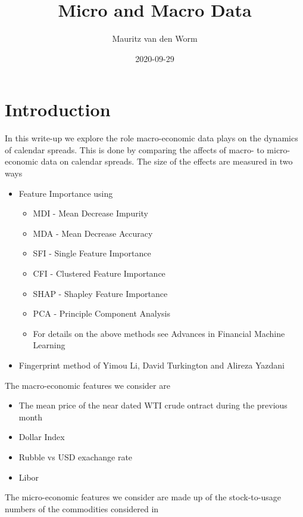 \documentclass[
]{book}
\title{Micro and Macro Data}
\author{Mauritz van den Worm}
\date{2020-09-29}
\providecommand{\tightlist}{%
  \setlength{\itemsep}{0pt}\setlength{\parskip}{0pt}}
\begin{document}
\maketitle

{
\setcounter{tocdepth}{1}
\tableofcontents
}
\hypertarget{intro}{%
\chapter{Introduction}\label{intro}}

In this write-up we explore the role macro-economic data plays on the dynamics of calendar spreads. This is done by comparing the affects of macro- to micro-economic data on calendar spreads. The size of the effects are measured in two ways

\begin{itemize}
\tightlist
\item
  Feature Importance using

  \begin{itemize}
  \tightlist
  \item
    MDI - Mean Decrease Impurity
  \item
    MDA - Mean Decrease Accuracy
  \item
    SFI - Single Feature Importance
  \item
    CFI - Clustered Feature Importance
  \item
    SHAP - Shapley Feature Importance
  \item
    PCA - Principle Component Analysis
  \item
    For details on the above methods see Advances in Financial Machine Learning
  \end{itemize}
\item
  Fingerprint method of Yimou Li, David Turkington and Alireza Yazdani
\end{itemize}

The macro-economic features we consider are

\begin{itemize}
\tightlist
\item
  The mean price of the near dated WTI crude ontract during the previous month
\item
  Dollar Index
\item
  Rubble vs USD exachange rate
\item
  Libor
\end{itemize}

The micro-economic features we consider are made up of the stock-to-usage numbers of the commodities considered in
\end{document}
